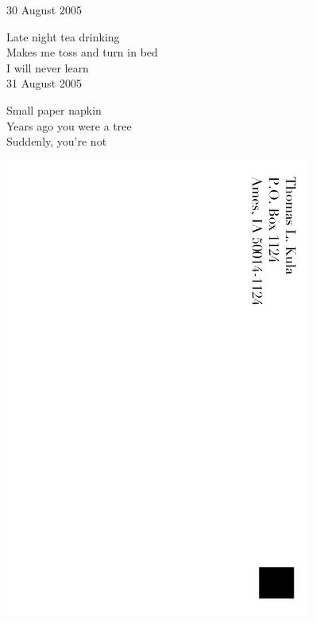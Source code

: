 \documentclass[12pt]{article}
\begin{document}
30 August 2005

Late night tea drinking \\
Makes me toss and turn in bed \\
I will never learn \\

31 August 2005

Small paper napkin \\
Years ago you were a tree \\
Suddenly, you're not \\



\newpage

\includegraphics[width=101mm]{backpage.png}
\end{document}
